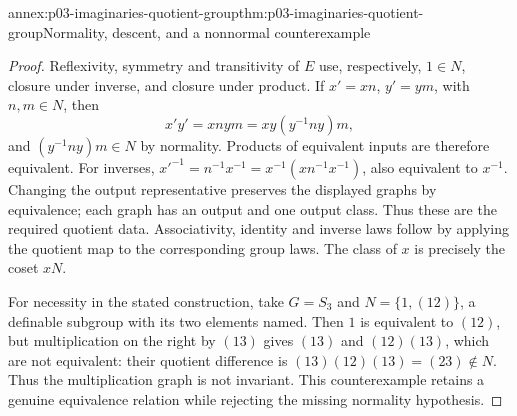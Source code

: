 \begin{annexitem}{annex:p03-imaginaries-quotient-group}{thm:p03-imaginaries-quotient-group}{Normality, descent, and a nonnormal counterexample}
\begin{proof}
Reflexivity, symmetry and transitivity of \(E\) use, respectively,
\(1\in N\), closure under inverse, and closure under product. If
\(x'=xn\), \(y'=ym\), with \(n,m\in N\), then
\[
 x'y'=xnym=xy(y^{-1}ny)m,
\]
and \((y^{-1}ny)m\in N\) by normality. Products of equivalent
inputs are therefore equivalent. For inverses,
\(x'^{-1}=n^{-1}x^{-1}=x^{-1}(xn^{-1}x^{-1})\), also equivalent
to \(x^{-1}\). Changing the output representative preserves the displayed
graphs by equivalence; each graph has an output and one output class.
Thus these are the required quotient data. Associativity, identity and inverse
laws follow by applying the quotient map to the corresponding group laws.
The class of \(x\) is precisely the coset \(xN\).

For necessity in the stated construction, take \(G=S_3\) and
\(N=\{1,(12)\}\), a definable subgroup with its two elements named.
Then \(1\) is equivalent to \((12)\), but multiplication on the right
by \((13)\) gives \((13)\) and \((12)(13)\), which are not
equivalent: their quotient difference is
\((13)(12)(13)=(23)\notin N\). Thus the multiplication graph is
not invariant. This counterexample retains a genuine equivalence relation
while rejecting the missing normality hypothesis.
\end{proof}
\end{annexitem}

